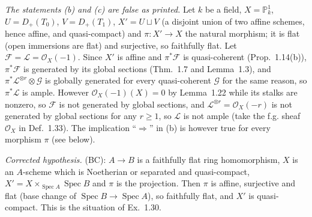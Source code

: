 \documentclass[11pt]{article}
\begin{document}
\emph{The statements (b) and (c) are false as printed.} Let $k$ be a field, $X=\mathbb{P}^1_k$, $U=D_+(T_0)$, $V=D_+(T_1)$, $X'=U\sqcup V$ (a disjoint union of two affine schemes, hence affine, and quasi-compact) and $\pi:X'\to X$ the natural morphism; it is flat (open immersions are flat) and surjective, so faithfully flat. Let $\mathcal{F}=\mathcal{L}=\mathcal{O}_X(-1)$. Since $X'$ is affine and $\pi^*\mathcal{F}$ is quasi-coherent (Prop.~1.14(b)), $\pi^*\mathcal{F}$ is generated by its global sections (Thm.~1.7 and Lemma~1.3), and $\pi^*\mathcal{L}^{\otimes r}\otimes\mathcal{G}$ is globally generated for every quasi-coherent $\mathcal{G}$ for the same reason, so $\pi^*\mathcal{L}$ is ample. However $\mathcal{O}_X(-1)(X)=0$ by Lemma~1.22 while its stalks are nonzero, so $\mathcal{F}$ is not generated by global sections, and $\mathcal{L}^{\otimes r}=\mathcal{O}_X(-r)$ is not generated by global sections for any $r\ge1$, so $\mathcal{L}$ is not ample (take the f.g. sheaf $\mathcal{O}_X$ in Def.~1.33). The implication ``$\Rightarrow$'' in (b) is however true for every morphism $\pi$ (see below).

\emph{Corrected hypothesis.} (BC): $A\to B$ is a faithfully flat ring homomorphism, $X$ is an $A$-scheme which is Noetherian or separated and quasi-compact, $X'=X\times_{\operatorname{Spec}A}\operatorname{Spec}B$ and $\pi$ is the projection. Then $\pi$ is affine, surjective and flat (base change of $\operatorname{Spec}B\to\operatorname{Spec}A$), so faithfully flat, and $X'$ is quasi-compact. This is the situation of Ex.~1.30.
\end{document}
